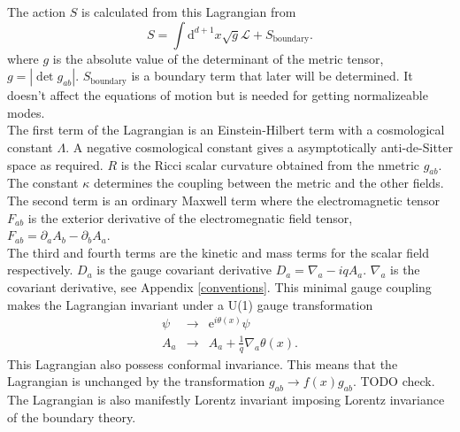 \documentclass[12pt]{report}
\renewcommand{\d}{\ensuremath{\mathrm{d}}}
\renewcommand{\L}{\ensuremath{\mathcal{L}}}
\begin{document}
The action $S$ is calculated from this Lagrangian from
\begin{equation}
 S=\int\d^{d+1} x\sqrt{g}\L+S_\mathrm{boundary}.
\end{equation}
where $g$ is the absolute value of the determinant of the metric tensor, $g=|\det g_{ab}|$. $S_\mathrm{boundary}$ is a boundary term that later will be determined. It doesn't affect the equations of motion but is needed for getting normalizeable modes.\\

The first term of the Lagrangian is an Einstein-Hilbert term with a cosmological constant $\Lambda$. A negative cosmological constant gives a asymptotically anti-de-Sitter space as required. $R$ is the Ricci scalar curvature obtained from the nmetric $g_{ab}$. The constant $\kappa$ determines the coupling between the metric and the other fields.\\

The second term is an ordinary Maxwell term where the electromagnetic tensor $F_{ab}$ is the exterior derivative of the electromegnatic field tensor, $F_{ab}=\partial_aA_b-\partial_bA_a$.\\

The third and fourth terms are the kinetic and mass terms for the scalar field respectively. $D_a$ is the gauge covariant derivative $D_a=\nabla_a-iqA_a$. $\nabla_a$ is the covariant derivative, see Appendix \ref{conventions}. This minimal gauge coupling makes the Lagrangian invariant under a U(1) gauge transformation
\begin{eqnarray}
 \psi&\rightarrow&\mathrm{e}^{i\theta(x)}\psi\\
 A_a&\rightarrow& A_a+\frac{1}{q}\nabla_a\theta(x)\label{Agauge}.
\end{eqnarray}
This Lagrangian also possess conformal invariance. This means that the Lagrangian is unchanged by the transformation $g_{ab}\rightarrow f(x)g_{ab}$. TODO check.
The Lagrangian is also manifestly Lorentz invariant imposing Lorentz invariance of the boundary theory.
\end{document}
